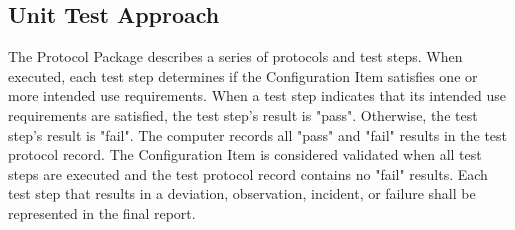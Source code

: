 \subsection{Unit Test Approach}
The Protocol Package describes a series of protocols and test steps.  When
executed, each test step determines if the Configuration Item satisfies one or
more intended use requirements.  When a test step indicates that its
intended use requirements are satisfied, the test step's result is "pass".
Otherwise, the test step's result is "fail".  The computer records all "pass"
and "fail" results in the test protocol record.  The Configuration Item is
considered validated when all test steps are executed and the test protocol
record contains no "fail" results.  Each test step that results in a deviation,
observation, incident, or failure shall be represented in the final report.
